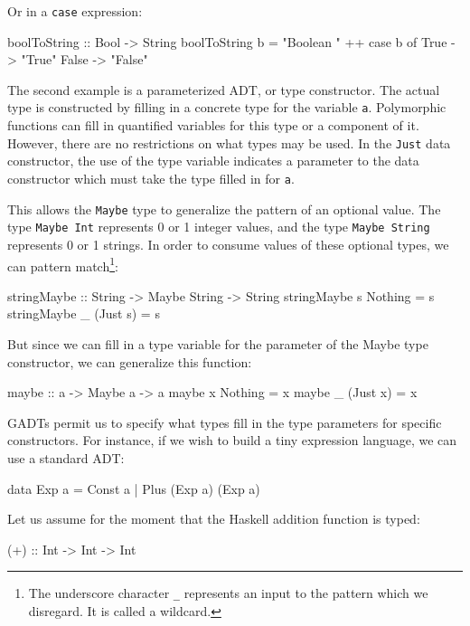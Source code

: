 Or in a {\tt case} expression:

\begin{code}
boolToString :: Bool -> String
boolToString b = "Boolean " ++ case b of
                                 True  -> "True"
                                 False -> "False"
\end{code}

The second example is a parameterized ADT, or type constructor. The actual type
is constructed by filling in a concrete type for the variable {\tt a}.
Polymorphic functions can fill in quantified variables for this type or a
component of it. However, there are no restrictions on what types may be used.
In the {\tt Just} data constructor, the use of the type variable indicates a
parameter to the data constructor which must take the type filled in for {\tt a}.

This allows the {\tt Maybe} type to generalize the pattern of an optional value.
The type {\tt Maybe Int} represents 0 or 1 integer values, and the type
{\tt Maybe String} represents 0 or 1 strings. In order to consume values of these
optional types, we can pattern match\footnote{The underscore character {\tt\_} 
represents an input to the pattern which we disregard. It is called a wildcard.}:

\begin{code}
stringMaybe :: String -> Maybe String -> String
stringMaybe s Nothing = s
stringMaybe _ (Just s)  = s
\end{code}

But since we can fill in a type variable for the parameter of the Maybe type
constructor, we can generalize this function:

\begin{code}
maybe :: a -> Maybe a -> a
maybe x Nothing  = x
maybe _ (Just x) = x
\end{code}

GADTs permit us to specify what types fill in the type parameters for specific
constructors. For instance, if we wish to build a tiny expression language,
we can use a standard ADT:

\begin{code}
data Exp a = Const a | Plus (Exp a) (Exp a)
\end{code}

Let us assume for the moment that the Haskell addition function is typed:

\begin{code}
(+) :: Int -> Int -> Int
\end{code}

